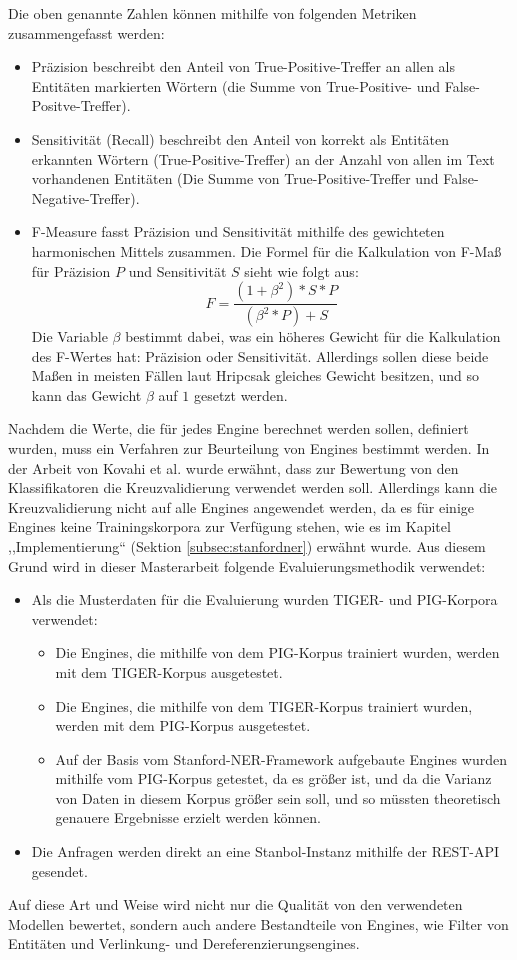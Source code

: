 Die oben genannte Zahlen können mithilfe von folgenden Metriken zusammengefasst werden\cite{och2003systematic}:
\begin{itemize}
\item Präzision beschreibt den Anteil von True-Positive-Treffer an allen als Entitäten markierten Wörtern (die Summe von True-Positive- und False-Positve-Treffer).
\item Sensitivität (Recall) beschreibt den Anteil von korrekt als Entitäten erkannten Wörtern (True-Positive-Treffer) an der Anzahl von allen im Text vorhandenen Entitäten (Die Summe von True-Positive-Treffer und False-Negative-Treffer).
\item F-Measure fasst Präzision und Sensitivität mithilfe des gewichteten harmonischen Mittels zusammen. Die Formel für die Kalkulation von F-Maß für Präzision $P$ und Sensitivität $S$ sieht wie folgt aus\cite{hripcsak2005agreement}:
$$
F=\frac{(1+\beta^2)*S*P}{(\beta^2*P)+S}
$$ 
Die Variable $\beta$ bestimmt dabei, was ein höheres Gewicht für die Kalkulation des F-Wertes hat: Präzision oder Sensitivität. Allerdings sollen diese beide Maßen in meisten Fällen laut Hripcsak\cite{hripcsak2005agreement} gleiches Gewicht besitzen, und so kann das Gewicht $\beta$ auf $1$ gesetzt werden.
\end{itemize}

Nachdem die Werte, die für jedes Engine berechnet werden sollen, definiert wurden, muss ein Verfahren zur Beurteilung von Engines bestimmt werden. In der Arbeit von Kovahi et al.\cite{kohavi1995study} wurde erwähnt, dass zur Bewertung von den Klassifikatoren die Kreuzvalidierung verwendet werden soll. Allerdings kann die Kreuzvalidierung nicht auf alle Engines angewendet werden, da es für einige Engines keine Trainingskorpora zur Verfügung stehen, wie es im Kapitel ,,Implementierung`` (Sektion \ref{subsec:stanfordner}) erwähnt wurde. Aus diesem Grund wird in dieser Masterarbeit folgende Evaluierungsmethodik verwendet:
\begin{itemize}
\item Als die Musterdaten für die Evaluierung wurden TIGER- und PIG-Korpora verwendet:
\begin{itemize}
\item Die Engines, die mithilfe von dem PIG-Korpus trainiert wurden, werden mit dem TIGER-Korpus ausgetestet.
\item Die Engines, die mithilfe von dem TIGER-Korpus trainiert wurden, werden mit dem PIG-Korpus ausgetestet.
\item Auf der Basis vom Stanford-NER-Framework aufgebaute Engines wurden mithilfe vom PIG-Korpus getestet, da es größer ist, und da die Varianz von Daten in diesem Korpus größer sein soll, und so müssten theoretisch genauere Ergebnisse erzielt werden können.
\end{itemize}
\item Die Anfragen werden direkt an eine Stanbol-Instanz mithilfe der REST-API gesendet.
\end{itemize}
Auf diese Art und Weise wird nicht nur die Qualität von den verwendeten Modellen bewertet, sondern auch andere Bestandteile von Engines, wie Filter von Entitäten und Verlinkung- und Dereferenzierungsengines.

